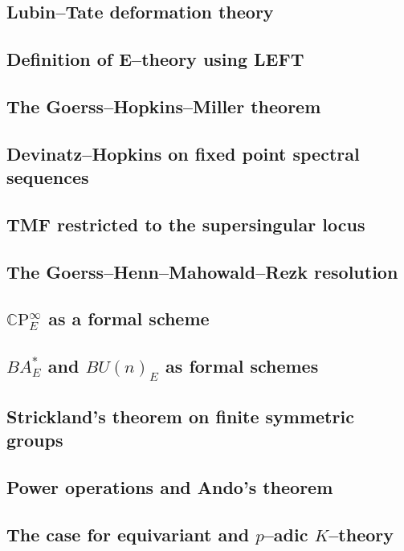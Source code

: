     \subsection*{Lubin--Tate deformation theory}
    \subsection*{Definition of E--theory using LEFT}

    \subsection*{The Goerss--Hopkins--Miller theorem}
    \subsection*{Devinatz--Hopkins on fixed point spectral sequences}
    \subsection*{TMF restricted to the supersingular locus}
    \subsection*{The Goerss--Henn--Mahowald--Rezk resolution}

    \subsection*{$\mathbb C \mathrm P^\infty_E$ as a formal scheme}
    \subsection*{$BA^*_E$ and $BU(n)_E$ as formal schemes}
    \subsection*{Strickland's theorem on finite symmetric groups}
    \subsection*{Power operations and Ando's theorem}

    \subsection*{The case for equivariant and $p$--adic $K$--theory}
